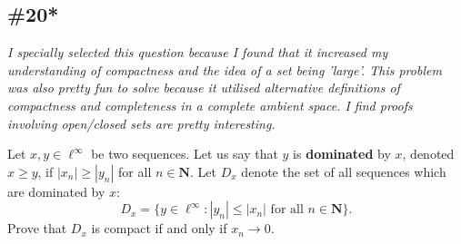 \documentclass{article}
\newcommand{\N}{\mathbf{N}}
\theoremstyle{plain} %
\numberwithin{thm}{section} %
\theoremstyle{definition}
\begin{document}
        \subsection{\#20*}

        \textit{I specially selected this question because I found that it increased my understanding of compactness and the idea of a set being 'large'. This problem was also pretty fun to solve because it utilised alternative definitions of compactness and completeness in a complete ambient space. I find proofs involving open/closed sets are pretty interesting.}

        Let $x,y\in \ell^\infty$ be two sequences. Let us say that $y$ is \textbf{dominated} by $x$, denoted $x\geq y$, if $|x_n|\geq |y_n|$ for all $n\in \N$. Let $D_x$ denote the set of all sequences which are dominated by $x$:
        \[ D_x = \{y\in \ell^\infty: |y_n|\leq |x_n| \text{ for all $n\in \N$}\}. \]
        Prove that $D_x$ is compact if and only if $x_n\rightarrow 0$.
\end{document}
